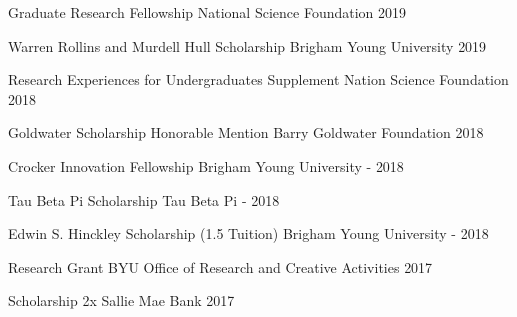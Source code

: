
\begin{cvhonors}

  \cvhonor
    {Graduate Research Fellowship} %
    {National Science Foundation} %
    {} %
    {2019} %
    
        
  \cvhonor
    {Warren Rollins and Murdell Hull Scholarship} %
    {Brigham Young University} %
    {} %
    {2019} %
    
  \cvhonor
    {Research Experiences for Undergraduates Supplement} %
    {Nation Science Foundation} %
    {} %
    {2018} %

  \cvhonor
    {Goldwater Scholarship Honorable Mention} %
    {Barry Goldwater Foundation} %
    {} %
    {2018} %
    
  \cvhonor
    {Crocker Innovation Fellowship} %
    {Brigham Young University} %
    {-} %
    {2018} %
    
  \cvhonor
    {Tau Beta Pi Scholarship} %
    {Tau Beta Pi} %
    {-} %
    {2018} %
    
  \cvhonor
    {Edwin S. Hinckley Scholarship (1.5 Tuition)} %
    {Brigham Young University} %
    {-} %
    {2018} %
    
  \cvhonor
    {Research Grant} %
    {BYU Office of Research and Creative Activities} %
    {} %
    {2017} %
    
  \cvhonor
    {Scholarship 2x} %
    {Sallie Mae Bank} %
    {} %
    {2017} %
    

\end{cvhonors}
